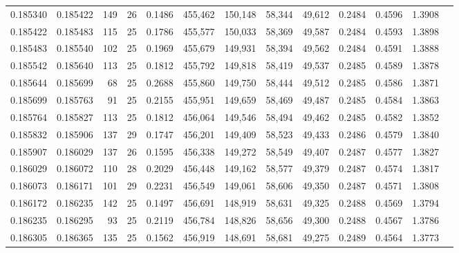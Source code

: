 \begin{tabular}{rrrrrrrrrrrrr}
0.185340 & 0.185422 & 149 &  26 &                                     0.1486 & 455,462 & 150,148 &  58,344 &  49,612 & 0.2484 & 0.4596 & 1.3908 \\
0.185422 & 0.185483 & 115 &  25 &                                     0.1786 & 455,577 & 150,033 &  58,369 &  49,587 & 0.2484 & 0.4593 & 1.3898 \\
0.185483 & 0.185540 & 102 &  25 &                                     0.1969 & 455,679 & 149,931 &  58,394 &  49,562 & 0.2484 & 0.4591 & 1.3888 \\
0.185542 & 0.185640 & 113 &  25 &                                     0.1812 & 455,792 & 149,818 &  58,419 &  49,537 & 0.2485 & 0.4589 & 1.3878 \\
0.185644 & 0.185699 &  68 &  25 &                                     0.2688 & 455,860 & 149,750 &  58,444 &  49,512 & 0.2485 & 0.4586 & 1.3871 \\
0.185699 & 0.185763 &  91 &  25 &                                     0.2155 & 455,951 & 149,659 &  58,469 &  49,487 & 0.2485 & 0.4584 & 1.3863 \\
0.185764 & 0.185827 & 113 &  25 &                                     0.1812 & 456,064 & 149,546 &  58,494 &  49,462 & 0.2485 & 0.4582 & 1.3852 \\
0.185832 & 0.185906 & 137 &  29 &                                     0.1747 & 456,201 & 149,409 &  58,523 &  49,433 & 0.2486 & 0.4579 & 1.3840 \\
0.185907 & 0.186029 & 137 &  26 &                                     0.1595 & 456,338 & 149,272 &  58,549 &  49,407 & 0.2487 & 0.4577 & 1.3827 \\
0.186029 & 0.186072 & 110 &  28 &                                     0.2029 & 456,448 & 149,162 &  58,577 &  49,379 & 0.2487 & 0.4574 & 1.3817 \\
0.186073 & 0.186171 & 101 &  29 &                                     0.2231 & 456,549 & 149,061 &  58,606 &  49,350 & 0.2487 & 0.4571 & 1.3808 \\
0.186172 & 0.186235 & 142 &  25 &                                     0.1497 & 456,691 & 148,919 &  58,631 &  49,325 & 0.2488 & 0.4569 & 1.3794 \\
0.186235 & 0.186295 &  93 &  25 &                                     0.2119 & 456,784 & 148,826 &  58,656 &  49,300 & 0.2488 & 0.4567 & 1.3786 \\
0.186305 & 0.186365 & 135 &  25 &                                     0.1562 & 456,919 & 148,691 &  58,681 &  49,275 & 0.2489 & 0.4564 & 1.3773 \\

\end{tabular}
